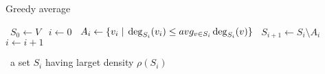 \begin{algorithm}
    \caption{Greedy average}\label{alg:greedy_parallel_avg}
    \begin{algorithmic}%
            \State~$S_0 \gets V$
            \State~$i \gets 0$
                    \State~$A_i \gets \{ v_i \; \vert \; \deg_{S_i}(v_i) \leq avg_{v \in S_i} \deg_{S_i}(v) \}$
                    \State~$S_{i+1} \gets S_i \setminus A_i$
                    \State~$i \gets i+1$
                \EndWhile
                
            \Return~a set $S_i$ having larget density $\rho(S_i)$
        \EndProcedure
    \end{algorithmic}
\end{algorithm}